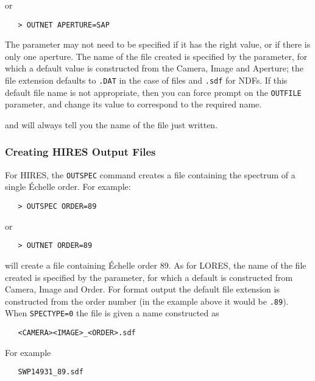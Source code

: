 or

\begin{verbatim}
   > OUTNET APERTURE=SAP
\end{verbatim}

The  parameter may not need to be
specified if it has the right
value, or if there is only one aperture.  The name of the file created is
specified by the  parameter, for which a
default value is
constructed from the Camera, Image and Aperture; the file extension defaults to
\verb+.DAT+ in the case of  files and
\verb+.sdf+ for NDFs.  If this
default file name is not appropriate, then you can force prompt on the
\verb+OUTFILE+ parameter, and change its value to correspond to the required
name.

 and 
 will always tell you the name of the file just written.

\subsubsection{Creating HIRES Output Files}

For HIRES, the \verb+OUTSPEC+ command creates a file containing the spectrum
of a single \'{E}chelle order.  For example:

\begin{verbatim}
   > OUTSPEC ORDER=89
\end{verbatim}

or

\begin{verbatim}
   > OUTNET ORDER=89
\end{verbatim}

will create a file containing \'{E}chelle order 89.  As for LORES, the name of
the file created is specified by the 
 parameter, for which a default is constructed from Camera, Image and Order.
For  format
output the default file extension is constructed from the order number (in the
example above it would be \verb+.89+)\@.  When \verb+SPECTYPE=0+ the file
is given a name constructed as

\begin{verbatim}
   <CAMERA><IMAGE>_<ORDER>.sdf
\end{verbatim}

For example

\begin{verbatim}
   SWP14931_89.sdf
\end{verbatim}

